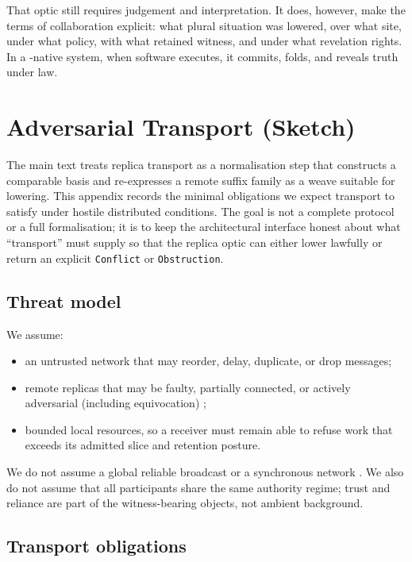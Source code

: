 \documentclass{aion}
\begin{document}
That optic still requires judgement and interpretation. It does, however, make
the terms of collaboration explicit: what plural situation was lowered, over
what site, under what policy, with what retained witness, and under what
revelation rights. In a \WARP{}-native system, when software executes, it
commits, folds, and reveals truth under law.

\clearpage
\appendix

\section{Adversarial Transport (Sketch)}
\label{sec:adversarial-transport}

The main text treats replica transport as a normalisation step that constructs a
comparable basis and re-expresses a remote suffix family as a weave suitable for
lowering. This appendix records the minimal obligations we expect transport to
satisfy under hostile distributed conditions. The goal is not a complete
protocol or a full formalisation; it is to keep the architectural interface
honest about what ``transport'' must supply so that the replica optic can either
lower lawfully or return an explicit \texttt{Conflict} or \texttt{Obstruction}.

\subsection{Threat model}

We assume:
\begin{itemize}[leftmargin=*]
	\item an untrusted network that may reorder, delay, duplicate, or drop
	      messages;
	\item remote replicas that may be faulty, partially connected, or actively
	      adversarial (including equivocation) \cite{LamportShostakPease1982};
	\item bounded local resources, so a receiver must remain able to refuse work
	      that exceeds its admitted slice and retention posture.
\end{itemize}
We do not assume a global reliable broadcast or a synchronous network
\cite{Bracha1987}. We also do not assume that all participants share the same
authority regime; trust and reliance are part of the witness-bearing objects,
not ambient background.

\subsection{Transport obligations}
\end{document}

